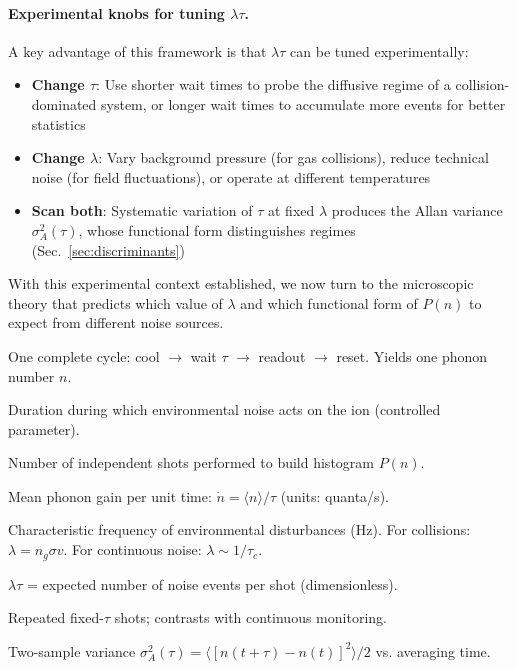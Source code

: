 \paragraph{Experimental knobs for tuning $\lambda\tau$.}
A key advantage of this framework is that $\lambda\tau$ can be tuned experimentally:
\begin{itemize}[nosep]
\item \textbf{Change $\tau$}: Use shorter wait times to probe the diffusive regime of a collision-dominated system, or longer wait times to accumulate more events for better statistics
\item \textbf{Change $\lambda$}: Vary background pressure (for gas collisions), reduce technical noise (for field fluctuations), or operate at different temperatures
\item \textbf{Scan both}: Systematic variation of $\tau$ at fixed $\lambda$ produces the Allan variance $\sigma^2_A(\tau)$, whose functional form distinguishes regimes (Sec.~\ref{sec:discriminants})
\end{itemize}

With this experimental context established, we now turn to the microscopic theory that predicts which value of $\lambda$ and which functional form of $P(n)$ to expect from different noise sources.

\begin{tcolorbox}[title=Experimental Terminology]
\begin{description}[leftmargin=3em,style=nextline,nosep]
\item[Shot] One complete cycle: cool $\to$ wait $\tau$ $\to$ readout $\to$ reset. Yields one phonon number $n$.
\item[Wait time $\tau$] Duration during which environmental noise acts on the ion (controlled parameter).
\item[Repetitions $N$] Number of independent shots performed to build histogram $P(n)$.
\item[Heating rate] Mean phonon gain per unit time: $\dot{n} = \langle n \rangle / \tau$ (units: quanta/s).
\item[Event rate $\lambda$] Characteristic frequency of environmental disturbances (Hz). For collisions: $\lambda = n_g \sigma v$. For continuous noise: $\lambda \sim 1/\tau_c$.
\item[Regime parameter] $\lambda\tau$ = expected number of noise events per shot (dimensionless).
\item[Stroboscopic measurement] Repeated fixed-$\tau$ shots; contrasts with continuous monitoring.
\item[Allan variance] Two-sample variance $\sigma^2_A(\tau) = \langle [n(t{+}\tau) - n(t)]^2 \rangle/2$ vs. averaging time.
\end{description}
\end{tcolorbox}